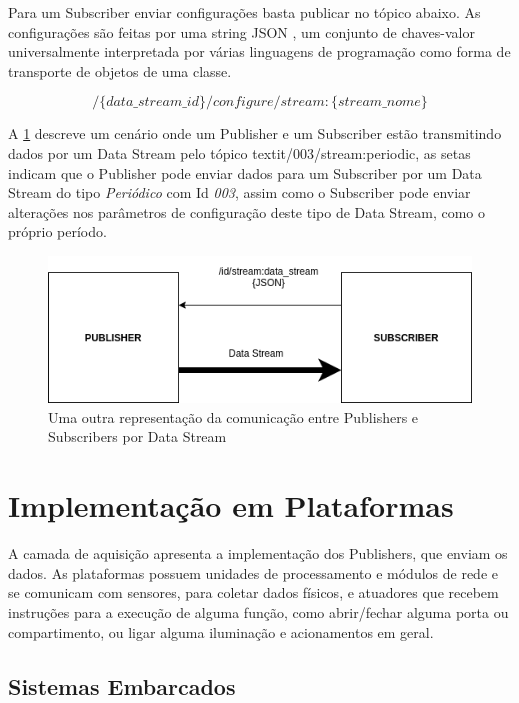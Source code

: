 Para um Subscriber enviar configurações basta publicar no tópico abaixo. As configurações são feitas por uma string JSON \cite{json}, um conjunto de chaves-valor universalmente interpretada por várias linguagens de programação como forma de transporte de objetos de uma classe. 

$$ /\{data\_stream\_id\}/configure/stream:\{stream\_nome\} $$

A \ref{fig:3.2.0/pub_sub} descreve um cenário onde um Publisher e um Subscriber estão transmitindo dados por um Data Stream pelo tópico textit{/003/stream:periodic}, as setas indicam que o Publisher pode enviar dados para um Subscriber por um Data Stream do tipo \textit{Periódico} com Id \textit{003}, assim como o Subscriber pode enviar alterações nos parâmetros de configuração deste tipo de Data Stream, como o próprio período.


\begin{figure}[h!]
\centering
\includegraphics[width=12cm]{./02_Capitulos/02_Cap3/figures/publisher-subscriber_comm}
\caption{Uma outra representação da comunicação entre Publishers e Subscribers por Data Stream}
\label{fig:3.2.0/pub_sub}
\end{figure}


\section{Implementação em Plataformas}
\label{subsection:plataformas}

A camada de aquisição apresenta a implementação dos Publishers, que enviam os dados. As plataformas possuem unidades de processamento e módulos de rede e se comunicam com sensores, para coletar dados físicos, e atuadores que recebem instruções para a execução de alguma função, como abrir/fechar alguma porta ou compartimento, ou ligar alguma iluminação e acionamentos em geral.

\subsection{Sistemas Embarcados}
\label{subsubsection:embarcados}

